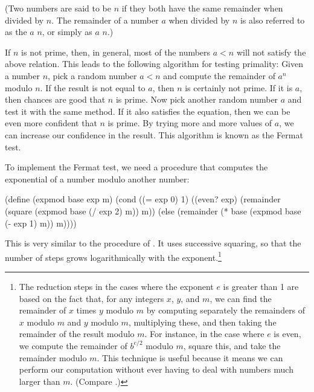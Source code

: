 \noindent
(Two numbers are said to be  \( n \) if they both have
the same remainder when divided by \( n \).  The remainder of a number \( a \) when
divided by \( n \) is also referred to as the  \( a \)
 \( n \), or simply as \( a \)  \( n \).)

If \( n \) is not prime, then, in general, most of the numbers \( a < n \) will
not satisfy the above relation.  This leads to the following algorithm for
testing primality: Given a number \( n \), pick a random number \( a < n \) and
compute the remainder of \( a^n \) modulo \( n \).  If the result is not equal
to \( a \), then \( n \) is certainly not prime.  If it is \( a \), then chances are
good that \( n \) is prime.  Now pick another random number \( a \) and test it
with the same method.  If it also satisfies the equation, then we can be even
more confident that \( n \) is prime.  By trying more and more values of \( a \),
we can increase our confidence in the result.  This algorithm is known as the
Fermat test.

To implement the Fermat test, we need a procedure that computes the exponential
of a number modulo another number:

\begin{codeBlock}
(define (expmod base exp m)
  (cond ((= exp 0) 1)
        ((even? exp)
         (remainder
          (square (expmod base (/ exp 2) m))
          m))
        (else
         (remainder
          (* base (expmod base (- exp 1) m))
          m))))
\end{codeBlock}

\noindent
This is very similar to the  procedure of .
It uses successive squaring, so that the number of steps grows logarithmically
with the exponent.\footnote{The reduction steps in the cases where the exponent
\( e \) is greater than 1 are based on the fact that, for any integers \( x \),
\( y \), and \( m \), we can find the remainder of \( x \) times \( y \) modulo \( m \)
by computing separately the remainders of \( x \) modulo \( m \) and \( y \) modulo
\( m \), multiplying these, and then taking the remainder of the result modulo
\( m \).  For instance, in the case where \( e \) is even, we compute the remainder
of \( b^{e / 2} \) modulo \( m \), square this, and take the remainder modulo
\( m \).  This technique is useful because it means we can perform our
computation without ever having to deal with numbers much larger than \( m \).
(Compare .)}

